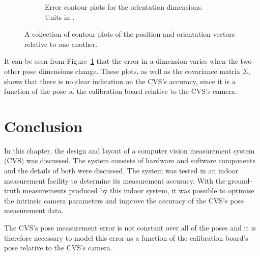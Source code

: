 \begin{figure}
\begin{subfigure}{0.48\textwidth}
\begin{subfigure}{\textwidth}
    \end{subfigure}
    \caption{Error contour plots for the orientation dimensions. Units in \textdegree.}
  \end{subfigure}
  \caption[A collection of contour plots of the position and orientation vectors relative to one another]{A collection of contour plots of the position and orientation vectors relative to one another.}
  \label{fig:err-contour}
\end{figure}

It can be seen from Figure~\ref{fig:err-contour} that the error in a dimension varies when the two other pose dimensions change. These plots, as well as the covariance matrix $\Sigma$, shows that there is no clear indication on the CVS's accuracy, since it is a function of the pose of the calibration board relative to the CVS's camera. 

\section{Conclusion}

In this chapter, the design and layout of a computer vision measurement system (CVS) was discussed. The system consists of hardware and software components and the details of both were discussed. The system was tested in an indoor measurement facility to determine its measurement accuracy. With the ground-truth measurements produced by this indoor system, it was possible to optimise the intrinsic camera parameters and improve the accuracy of the CVS's pose measurement data.

The CVS's pose measurement error is not constant over all of the poses and it is therefore necessary to model this error as a function of the calibration board's pose relative to the CVS's camera. 
